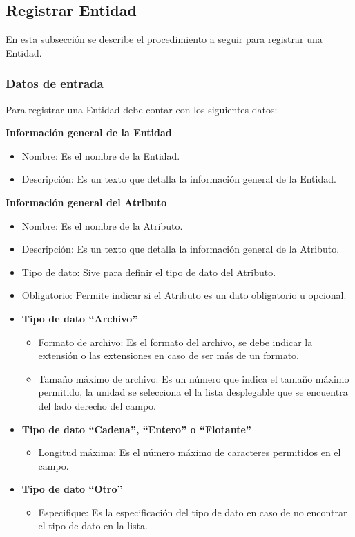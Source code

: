 \subsection{Registrar Entidad}
En esta subsección se describe el procedimiento a seguir para registrar una Entidad.

\subsubsection{Datos de entrada}
\begin{description}
	\item Para registrar una Entidad debe contar con los siguientes datos: \hspace{10pt}
	\begin{description}
	    \item \textbf{Información general de la Entidad}
	    \begin{itemize}
		  \item Nombre: Es el nombre de la Entidad.
		  \item Descripción: Es un texto que detalla la información general de la Entidad.
	    \end{itemize}
	    \item \textbf{Información general del Atributo}
	    \begin{itemize}
		  \item Nombre: Es el nombre de la Atributo.
		  \item Descripción: Es un texto que detalla la información general de la Atributo.
		  \item Tipo de dato: Sive para definir el tipo de dato del Atributo.
		  \item Obligatorio: Permite indicar si el Atributo es un dato obligatorio u opcional.
		  \item {\bf Tipo de dato ``Archivo''}
		  \begin{itemize}
		   \item Formato de archivo: Es el formato del archivo, se debe indicar la extensión o las extensiones en caso de ser más de un formato.
		   \item Tamaño máximo de archivo: Es un número que indica el tamaño máximo permitido, la unidad se selecciona el la lista desplegable que se encuentra del lado derecho del campo.
		  \end{itemize}
		  \item {\bf Tipo de dato ``Cadena'', ``Entero'' o ``Flotante''}
		  \begin{itemize}
		   \item Longitud máxima: Es el número máximo de caracteres permitidos en el campo.
		  \end{itemize}
		  \item {\bf Tipo de dato ``Otro''}
		  \begin{itemize}
		   \item Especifique: Es la especificación del tipo de dato en caso de no encontrar el tipo de dato en la lista.
		  \end{itemize}
		  
	    \end{itemize}
	 \end{description}
\end{description}

